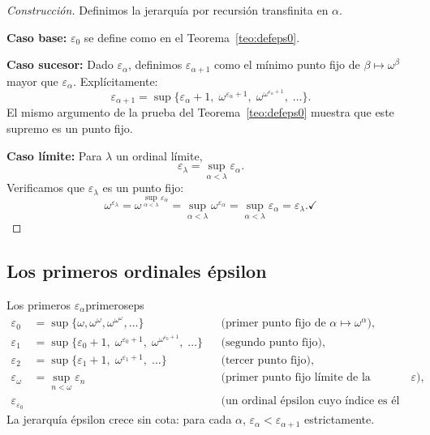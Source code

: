 \begin{proof}[Construcción]
Definimos la jerarquía por recursión transfinita en $\alpha$.

\textbf{Caso base:} $\varepsilon_0$ se define como en el Teorema~\ref{teo:defeps0}.

\textbf{Caso sucesor:} Dado $\varepsilon_\alpha$, definimos $\varepsilon_{\alpha+1}$ como el mínimo punto fijo de $\beta \mapsto \omega^\beta$ mayor que $\varepsilon_\alpha$. Explícitamente:
\[
  \varepsilon_{\alpha+1} = \sup\{\varepsilon_\alpha + 1,\; \omega^{\varepsilon_\alpha+1},\; \omega^{\omega^{\varepsilon_\alpha+1}},\; \ldots\}.
\]
El mismo argumento de la prueba del Teorema~\ref{teo:defeps0} muestra que este supremo es un punto fijo.

\textbf{Caso límite:} Para $\lambda$ un ordinal límite,
\[
  \varepsilon_\lambda = \sup_{\alpha < \lambda} \varepsilon_\alpha.
\]
Verificamos que $\varepsilon_\lambda$ es un punto fijo:
\[
  \omega^{\varepsilon_\lambda}
  = \omega^{\sup_{\alpha < \lambda}\varepsilon_\alpha}
  = \sup_{\alpha < \lambda} \omega^{\varepsilon_\alpha}
  = \sup_{\alpha < \lambda} \varepsilon_\alpha
  = \varepsilon_\lambda. \checkmark
\]
\end{proof}

\subsection{Los primeros ordinales épsilon}

\begin{ejemplo}{Los primeros $\varepsilon_\alpha$}{primeroseps}
\begin{align*}
  \varepsilon_0 &= \sup\{\omega, \omega^\omega, \omega^{\omega^\omega}, \ldots\}
    &&\text{(primer punto fijo de $\alpha \mapsto \omega^\alpha$),} \\
  \varepsilon_1 &= \sup\{\varepsilon_0+1,\; \omega^{\varepsilon_0+1},\; \omega^{\omega^{\varepsilon_0+1}},\; \ldots\}
    &&\text{(segundo punto fijo),} \\
  \varepsilon_2 &= \sup\{\varepsilon_1+1,\; \omega^{\varepsilon_1+1},\; \ldots\}
    &&\text{(tercer punto fijo),} \\
  \varepsilon_\omega &= \sup_{n < \omega} \varepsilon_n
    &&\text{(primer punto fijo límite de la jerarquía $\varepsilon$),} \\
  \varepsilon_{\varepsilon_0} &
    &&\text{(un ordinal épsilon cuyo índice es él mismo un ordinal épsilon).}
\end{align*}
La jerarquía épsilon crece sin cota: para cada $\alpha$, $\varepsilon_\alpha < \varepsilon_{\alpha+1}$ estrictamente.
\end{ejemplo}

